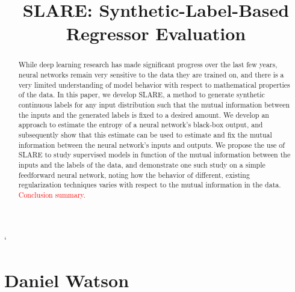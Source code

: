 \documentclass{NSF}
\begin{document}
`
\title{SLARE: Synthetic-Label-Based Regressor Evaluation}
\section{Daniel Watson}

\begin{abstract}
While deep learning research has made significant progress over the last few years,
neural networks remain very sensitive to the data they are trained on, and there is
a very limited understanding of model behavior with respect to mathematical properties
of the data. In this paper, we develop SLARE, a method to generate synthetic continuous
labels for any input distribution such that the mutual information between the inputs
and the generated labels is fixed to a desired amount. We develop an approach to
estimate the entropy of a neural network's black-box output, and subsequently show that
this estimate can be used to estimate and fix the mutual information between the neural
network's inputs and outputs. We propose the use of SLARE to study supervised models in
function of the mutual information between the inputs and the labels of the data, and
demonstrate one such study on a simple feedforward neural network, noting how the
behavior of different, existing regularization techniques varies with respect to the
mutual information in the data. \textcolor{red}{Conclusion summary.}

\end{abstract}
\end{document}
